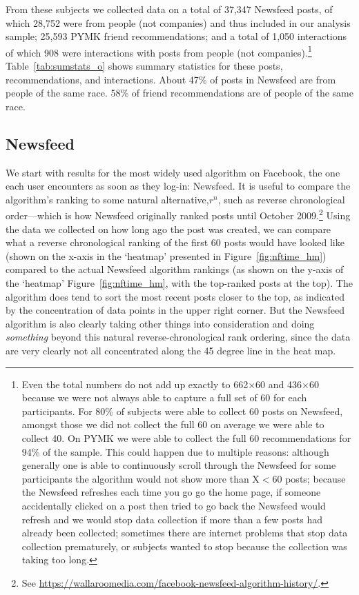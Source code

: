 \documentclass[12pt,letterpaper]{article}
\newcommand{\FullNFUSSurveySampleSize}{662}
\newcommand{\PYMKUSSurveySampleSize}{436}
\newcommand{\numposts}{37,347}
\newcommand{\numhposts}{28,752}
\newcommand{\numrecs}{25,593}
\newcommand{\numinteract}{1,050}
\newcommand{\numhinteract}{908}
\begin{document}
From these subjects we collected data on a total of \numposts{} Newsfeed posts, of which \numhposts{} were from people (not companies) and thus included in our analysis sample; \numrecs{} PYMK friend recommendations; and a total of \numinteract{} interactions of which \numhinteract{} were interactions with posts from people (not companies).\footnote{Even the total numbers do not add up exactly to \FullNFUSSurveySampleSize{}$\times$60 and \PYMKUSSurveySampleSize{}$\times$60 because we were not always able to capture a full set of 60 for each participants. For 80\% of subjects were able to collect 60 posts on Newsfeed, amongst those we did not collect the full 60 on average we were able to collect 40. On PYMK we were able to collect the full 60 recommendations for 94\% of the sample.  This could happen due to multiple reasons: although generally one is able to continuously scroll through the Newsfeed for some participants the algorithm would not show more than X$<$60 posts; because the Newsfeed refreshes each time you go go the home page, if someone accidentally clicked on a post then tried to go back the Newsfeed would refresh and we would stop data collection if more than a few posts had already been collected; sometimes there are internet problems that stop data collection prematurely, or subjects wanted to stop because the collection was taking too long.} Table~\ref{tab:sumstats_o} shows summary statistics for these posts, recommendations, and interactions.  About 47\% of posts in Newsfeed are from people of the same race. 58\% of friend recommendations are of people of the same race.

\subsection{Newsfeed}

We start with results for the most widely used algorithm on Facebook, the one each user encounters as soon as they log-in: Newsfeed. It is useful to compare the algorithm's ranking to some natural alternative,$r^n$, such as reverse chronological order---which is how Newsfeed originally ranked posts until October 2009.\footnote{See \url{https://wallaroomedia.com/facebook-newsfeed-algorithm-history/}.} Using the data we collected on how long ago the post was created, we can compare what a reverse chronological ranking of the first 60 posts would have looked like (shown on the x-axis in the `heatmap' presented in Figure~\ref{fig:nftime_hm}) compared to the actual Newsfeed algorithm rankings (as shown on the y-axis of the `heatmap' Figure~\ref{fig:nftime_hm}, with the top-ranked posts at the top). The algorithm does tend to sort the most recent posts closer to the top, as indicated by the concentration of data points in the upper right corner. But the Newsfeed algorithm is also clearly taking other things into consideration and doing \emph{something} beyond this natural reverse-chronological rank ordering, since the data are very clearly not all concentrated along the 45 degree line in the heat map.
\end{document}
